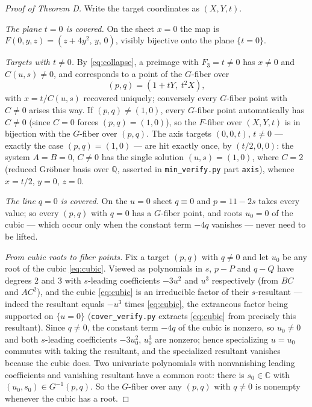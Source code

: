 \documentclass[11pt]{amsart}
\newcommand{\CC}{\mathbb{C}}
\newcommand{\QQ}{\mathbb{Q}}
\theoremstyle{plain}
\theoremstyle{definition}
\theoremstyle{remark}
\begin{document}
\begin{proof}[Proof of Theorem D]
Write the target coordinates as $(X,Y,t)$.

\emph{The plane $t=0$ is covered.} On the sheet $x=0$ the map is
$F(0,y,z)=(z+4y^{2},\,y,\,0)$, visibly bijective onto the plane
$\{t=0\}$.

\emph{Targets with $t\neq0$.} By \eqref{eq:collapse}, a preimage with
$F_{3}=t\neq0$ has $x\ne0$ and $C(u,s)\neq0$, and corresponds to a point
of the $G$-fiber over
\[
(p,q)=(1+tY,\;t^{2}X),
\]
with $x=t/C(u,s)$ recovered uniquely; conversely every $G$-fiber point
with $C\neq0$ arises this way. If $(p,q)\ne(1,0)$, every $G$-fiber point
automatically has $C\neq0$ (since $C=0$ forces $(p,q)=(1,0)$), so the
$F$-fiber over $(X,Y,t)$ is in bijection with the $G$-fiber over $(p,q)$.
The axis targets $(0,0,t)$, $t\neq0$ --- exactly the case $(p,q)=(1,0)$
--- are hit exactly once, by $(t/2,0,0)$: the system $A=B=0$, $C\neq0$
has the single solution $(u,s)=(1,0)$, where $C=2$ (reduced Gr\"obner
basis over $\QQ$, asserted in \texttt{min\_verify.py} part
\texttt{axis}), whence $x=t/2$, $y=0$, $z=0$.

\emph{The line $q=0$ is covered.} On the $u=0$ sheet $q\equiv0$ and
$p=11-2s$ takes every value; so every $(p,q)$ with $q=0$ has a $G$-fiber
point, and roots $u_{0}=0$ of the cubic --- which occur only when the
constant term $-4q$ vanishes --- never need to be lifted.

\emph{From cubic roots to fiber points.} Fix a target $(p,q)$ with
$q\neq0$ and let $u_{0}$ be any root of the cubic \eqref{eq:cubic}. Viewed
as polynomials in $s$, $p-P$ and $q-Q$ have degrees $2$ and $3$ with
$s$-leading coefficients $-3u^{2}$ and $u^{3}$ respectively (from
$BC$ and $AC^{2}$), and the cubic \eqref{eq:cubic} is an irreducible
factor of their $s$-resultant --- indeed the resultant equals $-u^{3}$
times \eqref{eq:cubic}, the extraneous factor being supported on
$\{u=0\}$ (\texttt{cover\_verify.py} extracts \eqref{eq:cubic} from
precisely this resultant). Since $q\neq0$, the constant term $-4q$ of the
cubic is nonzero, so $u_{0}\neq0$ and both $s$-leading coefficients
$-3u_{0}^{2}$, $u_{0}^{3}$ are nonzero; hence specializing $u=u_{0}$
commutes with taking the resultant, and the specialized resultant
vanishes because the cubic does. Two univariate polynomials with
nonvanishing leading coefficients and vanishing resultant have a common
root: there is $s_{0}\in\CC$ with $(u_{0},s_{0})\in G^{-1}(p,q)$. So the
$G$-fiber over any $(p,q)$ with $q\neq0$ is nonempty whenever the cubic
has a root.


\end{proof}
\end{document}
